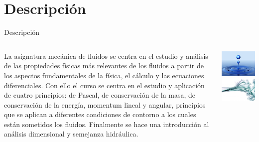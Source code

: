 \documentclass [xcolor=svgnames, t] {beamer}
\begin{document}
\section{Descripci\'on}
\begin{frame}{Descripci\'on}
\vspace{-0.8cm} 
\begin{columns}
\begin{exampleblock}{}
\small
La asignatura mecánica de fluidos se centra en el estudio y análisis de las propiedades físicas más relevantes de los fluidos a partir de los aspectos fundamentales de la física, el cálculo y las ecuaciones diferenciales. Con ello el curso se centra en el estudio y aplicación de \alert{cuatro principios: de Pascal, de conservación de la masa, de conservación de la energía, momentum lineal y angular}, principios que se aplican a diferentes condiciones de contorno a los cuales están sometidos los fluidos. Finalmente se hace una introducción al análisis dimensional y semejanza hidráulica.
\end{exampleblock}
\begin{center}
\includegraphics[width=\textwidth]{fm}
\includegraphics[width=\textwidth]{fm1}
\end{center}
\end{columns}
\end{frame}
\end{document}
